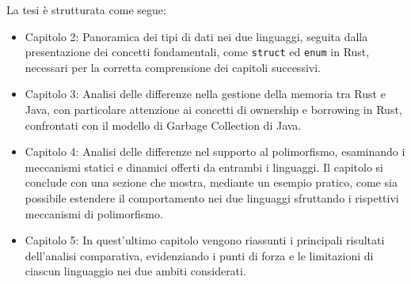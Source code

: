 La tesi è strutturata come segue: 
\begin{itemize}
    \item Capitolo 2: Panoramica dei tipi di dati nei due linguaggi, seguita dalla presentazione dei concetti fondamentali, come \texttt{struct} ed \texttt{enum} in Rust, necessari per la corretta comprensione dei capitoli successivi. 
    \item Capitolo 3: Analisi delle differenze nella gestione della memoria tra Rust e Java, con particolare attenzione ai concetti di ownership e borrowing in Rust, confrontati con il modello di Garbage Collection di Java.
    \item Capitolo 4: Analisi delle differenze nel supporto al polimorfismo, esaminando i meccanismi statici e dinamici offerti da entrambi i linguaggi. Il capitolo si conclude con una sezione che mostra, mediante un esempio pratico, come sia possibile estendere il comportamento nei due linguaggi sfruttando i rispettivi meccanismi di polimorfismo.
    \item Capitolo 5: In quest'ultimo capitolo vengono riassunti i principali risultati dell'analisi comparativa, evidenziando i punti di forza e le limitazioni di ciascun linguaggio nei due ambiti considerati. 
\end{itemize}
